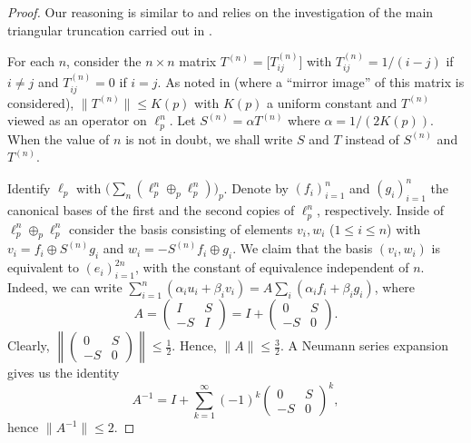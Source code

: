 \documentclass[12pt,leqno]{amsart}
\numberwithin{equation}{section}
\theoremstyle{definition}
\begin{document}
\begin{proof}
Our reasoning is similar to \cite[Section 7.1]{OTTT} and relies on the investigation of the main triangular truncation carried out in \cite{KP}. 
\medskip

For each $n$, consider the $n \times n$ matrix $T^{(n)} = \big[ T^{(n)}_{ij} \big]$ with $T^{(n)}_{ij} = 1/(i-j)$ if $i \neq j$ and $T^{(n)}_{ij} = 0$ if $i=j$.
As noted in \cite[(1.7)]{KP} (where a ``mirror image'' of this matrix is considered), $\|T^{(n)}\| \leq K(p)$ with $K(p)$  a uniform constant and $T^{(n)}$  viewed as an operator on $\ell_p^n$.
Let $S^{(n)} = \alpha T^{(n)}$ where $\alpha = 1/(2 K(p))$.
When the value of $n$ is not in doubt, we shall write $S$ and $T$ instead of $S^{(n)}$ and $T^{(n)}$.
\medskip

Identify $\ell_p$ with $\big( \sum_n (\ell_p^n \oplus_p \ell_p^n) \big)_p$.
Denote by $(f_i)_{i=1}^n$ and $(g_i)_{i=1}^n$ the canonical bases of the first and the second copies of $\ell_p^n$, respectively.
Inside of $\ell_p^n \oplus_p \ell_p^n$ consider the basis consisting of elements $v_i, w_i$ ($1 \leq i \leq n$) with $v_i = f_i \oplus S^{(n)} g_i$ and $w_i = - S^{(n)} f_i \oplus g_i$. 
We claim that the basis $(v_i, w_i)$ is equivalent to $(e_i)_{i=1}^{2n}$, with the constant of equivalence independent of $n$.
Indeed, we can write $\sum_{i=1}^n (\alpha_i u_i + \beta_i v_i) = A \sum_i (\alpha_i f_i + \beta_i g_i)$, where
$$
A = \begin{pmatrix}  I & S  \\  -S & I  \end{pmatrix} = I + \begin{pmatrix}  0 & S  \\  -S & 0  \end{pmatrix} .
$$
Clearly, $\left\| \begin{pmatrix}  0 & S  \\  -S & 0  \end{pmatrix} \right\| \leq \frac12$. Hence, $\|A\| \leq \frac32$. A Neumann series expansion gives us the identity
$$
A^{-1} = I + \sum_{k=1}^\infty (-1)^k \begin{pmatrix}  0 & S  \\  -S & 0  \end{pmatrix}^k ,
$$
hence $\|A^{-1}\| \leq 2$.
\medskip


\end{proof}
\end{document}
